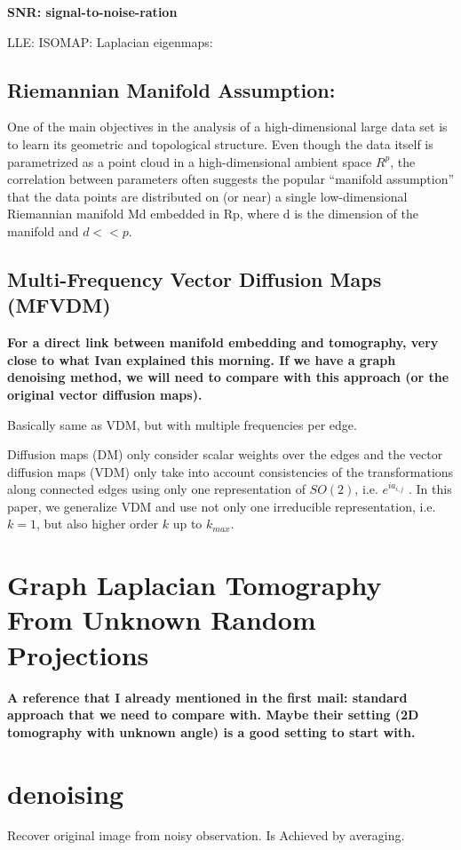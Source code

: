 \textbf{SNR: signal-to-noise-ration}


LLE:
ISOMAP:
Laplacian eigenmaps:


\subsection{Riemannian Manifold Assumption:}
One of the main objectives in the analysis of a high-dimensional large data set
is to learn its geometric and topological structure. Even though the data itself is
parametrized as a point cloud in a high-dimensional ambient space $R^p$, the correlation
between parameters often suggests the popular “manifold assumption” that
the data points are distributed on (or near) a single low-dimensional Riemannian
manifold Md embedded in Rp, where d is the dimension of the manifold and
$d << p$.


\subsection{Multi-Frequency Vector Diffusion Maps (MFVDM)}
\cite{multiDiffusionMaps}
\textbf{For a direct link between manifold embedding and tomography, very close to what Ivan explained this morning.
If we have a graph denoising method, we will need to compare with this approach 
(or the original vector diffusion maps).}

Basically same as VDM, but with multiple frequencies per edge.

Diffusion maps (DM) only consider scalar weights over the edges and the vector
diffusion maps (VDM) only take into account consistencies
of the transformations along connected edges using only one
representation of $SO(2)$, i.e. $e^{ia_{i,j}}$ . In this paper, we generalize
VDM and use not only one irreducible representation,
i.e. $k = 1$, but also higher order $k$ up to $k_{max}$.


\section{Graph Laplacian Tomography From Unknown Random Projections}
\textbf{A reference that I already mentioned in the first mail:
standard approach that we need to compare with. 
Maybe their setting (2D tomography with unknown angle) is a good setting to start with.
}

\section{denoising}
Recover original image from noisy observation.
Is Achieved by averaging.

